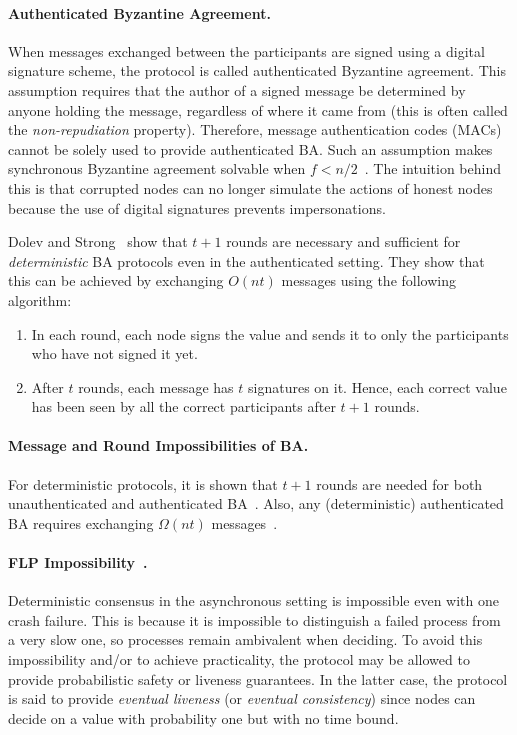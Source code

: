 \documentclass[11pt]{article}
\theoremstyle{mytheoremstyle}
\begin{document}
\paragraph{Authenticated Byzantine Agreement.}
When messages exchanged between the participants are signed using a digital signature scheme, the protocol is called authenticated Byzantine agreement. This assumption requires that the author of a signed message be determined by anyone holding the message, regardless of where it came from (this is often called the \emph{non-repudiation} property). Therefore, message authentication codes (MACs) cannot be solely used to provide authenticated BA. Such an assumption makes synchronous Byzantine agreement solvable when $f<n/2$~\cite{srini2017}. The intuition behind this is that corrupted nodes can no longer simulate the actions of honest nodes because the use of digital signatures prevents impersonations.

Dolev and Strong~\cite{Dolev:Strong:83} show that $t + 1$ rounds are necessary and sufficient for \emph{deterministic} BA protocols even in the authenticated setting. They show that this can be achieved by exchanging $O(nt)$ messages using the following algorithm:

\begin{enumerate}
	\item In each round, each node signs the value and sends it to only the participants who have not signed it yet.
	\item After $t$ rounds, each message has $t$ signatures on it. Hence, each correct value has been seen by all the correct participants after $t+1$ rounds.
\end{enumerate}

\paragraph{Message and Round Impossibilities of BA.}
For deterministic protocols, it is shown that $t+1$ rounds are needed for both unauthenticated and authenticated BA~\cite{FischerLynch81,Dolev:1982:STOC}. Also, any (deterministic) authenticated BA requires exchanging $\Omega(nt)$ messages~\cite{dolev:reischuk:82}.

\paragraph{FLP Impossibility~\cite{FLP}.} Deterministic consensus in the asynchronous setting is impossible even with one crash failure. This is because it is impossible to distinguish a failed process from a very slow one, so processes remain ambivalent when deciding. To avoid this impossibility and/or to achieve practicality, the protocol may be allowed to provide probabilistic safety or liveness guarantees. In the latter case, the protocol is said to provide \emph{eventual liveness} (or \emph{eventual consistency}) since nodes can decide on a value with probability one but with no time bound.
\end{document}
